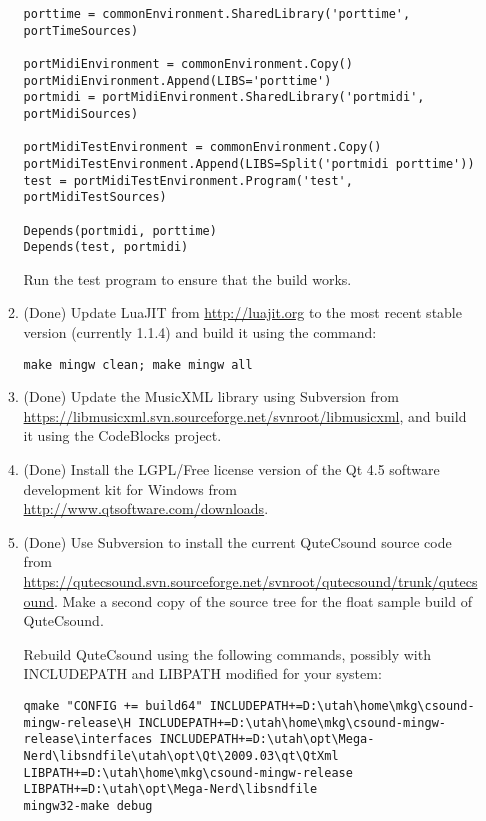 \documentclass[11pt,letterpaper,onecolumn]{scrartcl}
\begin{document}
\begin{sloppypar}
\begin{enumerate}
\begin{enumerate}
\begin{lstlisting}
porttime = commonEnvironment.SharedLibrary('porttime', portTimeSources)

portMidiEnvironment = commonEnvironment.Copy()
portMidiEnvironment.Append(LIBS='porttime')
portmidi = portMidiEnvironment.SharedLibrary('portmidi', portMidiSources)

portMidiTestEnvironment = commonEnvironment.Copy()
portMidiTestEnvironment.Append(LIBS=Split('portmidi porttime'))
test = portMidiTestEnvironment.Program('test', portMidiTestSources)

Depends(portmidi, porttime)
Depends(test, portmidi)
\end{lstlisting}

			Run the test program to ensure that the build works.
		  
		  \item (Done) Update LuaJIT from \url{http://luajit.org} to the most recent stable version (currently 1.1.4) and build it using the command:
		  
\begin{lstlisting}
make mingw clean; make mingw all
\end{lstlisting}

			\item (Done) Update the MusicXML library using Subversion from \url{https://libmusicxml.svn.sourceforge.net/svnroot/libmusicxml}, and build it using the CodeBlocks project.

			\item (Done) Install the LGPL/Free license version of the Qt 4.5 software development kit for Windows from \url{http://www.qtsoftware.com/downloads}.
			
			\item (Done) Use Subversion to install the current QuteCsound source code from \url{https://qutecsound.svn.sourceforge.net/svnroot/qutecsound/trunk/qutecsound}. Make a second copy of the source tree for the float sample build of QuteCsound.
			
			Rebuild QuteCsound using the following commands, possibly with INCLUDEPATH and LIBPATH modified for your system:
			
			\begin{lstlisting}
qmake "CONFIG += build64" INCLUDEPATH+=D:\utah\home\mkg\csound-mingw-release\H INCLUDEPATH+=D:\utah\home\mkg\csound-mingw-release\interfaces INCLUDEPATH+=D:\utah\opt\Mega-Nerd\libsndfile\utah\opt\Qt\2009.03\qt\QtXml LIBPATH+=D:\utah\home\mkg\csound-mingw-release LIBPATH+=D:\utah\opt\Mega-Nerd\libsndfile
mingw32-make debug
			\end{lstlisting}
			

\end{enumerate}
\end{enumerate}
\end{sloppypar}
\end{document}

